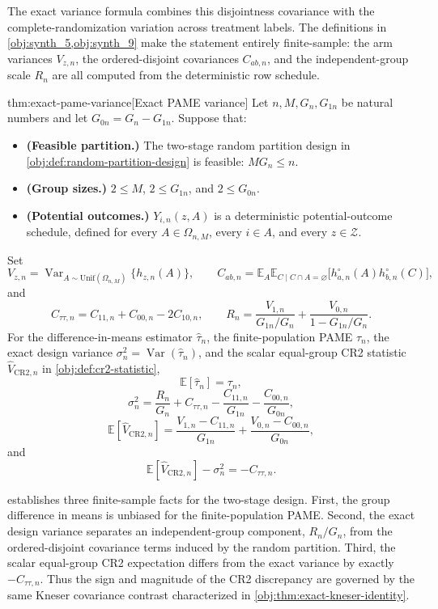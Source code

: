 \documentclass[11pt]{article}
\begin{document}
The exact variance formula combines this disjointness covariance with the complete-randomization variation across treatment labels. The definitions in \cref{obj:synth_5,obj:synth_9} make the statement entirely finite-sample: the arm variances \(V_{z,n}\), the ordered-disjoint covariances \(C_{ab,n}\), and the independent-group scale \(R_n\) are all computed from the deterministic row schedule.

\begin{theoremv}{thm:exact-pame-variance}[Exact PAME variance]
Let \(n,M,G_n,G_{1n}\) be natural numbers and let \(G_{0n}=G_n-G_{1n}\). Suppose that:
\begin{itemize}
\item \textbf{(Feasible partition.)} The two-stage random partition design in \cref{obj:def:random-partition-design} is feasible: \(M G_n\le n\).
\item \textbf{(Group sizes.)} \(2\le M\), \(2\le G_{1n}\), and \(2\le G_{0n}\).
\item \textbf{(Potential outcomes.)} \(Y_{i,n}(z,A)\) is a deterministic potential-outcome schedule, defined for every \(A\in\Omega_{n,M}\), every \(i\in A\), and every \(z\in\mathcal Z\).
\end{itemize}
Set
\[
V_{z,n}
=
\operatorname{Var}_{A\sim\mathrm{Unif}(\Omega_{n,M})}\{h_{z,n}(A)\},
\qquad
C_{ab,n}
=
\mathbb E_{A}\mathbb E_{C\mid C\cap A=\varnothing}
\bigl[h_{a,n}^{\circ}(A)h_{b,n}^{\circ}(C)\bigr],
\]
and
\[
C_{\tau\tau,n}=C_{11,n}+C_{00,n}-2C_{10,n},
\qquad
R_n=\frac{V_{1,n}}{G_{1n}/G_n}+\frac{V_{0,n}}{1-G_{1n}/G_n}.
\]
For the difference-in-means estimator \(\widehat\tau_n\), the finite-population PAME \(\tau_n\), the exact design variance \(\sigma_n^2=\operatorname{Var}(\widehat\tau_n)\), and the scalar equal-group CR2 statistic \(\widehat V_{\mathrm{CR2},n}\) in \cref{obj:def:cr2-statistic},
\[
\mathbb E[\widehat\tau_n]=\tau_n,
\]
\[
\sigma_n^2
=
\frac{R_n}{G_n}
+
C_{\tau\tau,n}
-
\frac{C_{11,n}}{G_{1n}}
-
\frac{C_{00,n}}{G_{0n}},
\]
\[
\mathbb E[\widehat V_{\mathrm{CR2},n}]
=
\frac{V_{1,n}-C_{11,n}}{G_{1n}}
+
\frac{V_{0,n}-C_{00,n}}{G_{0n}},
\]
and
\[
\mathbb E[\widehat V_{\mathrm{CR2},n}]-\sigma_n^2=-C_{\tau\tau,n}.
\]
\end{theoremv}

 establishes three finite-sample facts for the two-stage design. First, the group difference in means is unbiased for the finite-population PAME. Second, the exact design variance separates an independent-group component, \(R_n/G_n\), from the ordered-disjoint covariance terms induced by the random partition. Third, the scalar equal-group CR2 expectation differs from the exact variance by exactly \(-C_{\tau\tau,n}\). Thus the sign and magnitude of the CR2 discrepancy are governed by the same Kneser covariance contrast characterized in \cref{obj:thm:exact-kneser-identity}.
\end{document}
